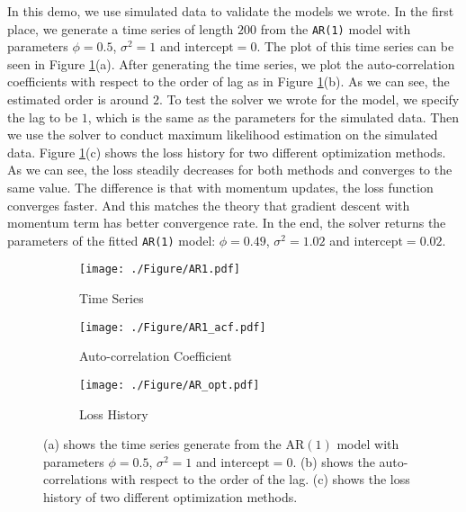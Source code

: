 In this demo, we use simulated data to validate the models we wrote. In the first place, we generate a time series of length $200$ from the \texttt{AR(1)}  model with parameters $\phi = 0.5$, $\sigma^2 = 1$ and $\text{intercept}=0$. The plot of this time series can be seen in Figure \ref{fig:AR1}(a). After generating the time series, we plot the auto-correlation coefficients with respect to the order of lag as in Figure \ref{fig:AR1}(b). As we can see, the estimated order is around $2$. To test the solver we wrote for the model, we specify the lag to be $1$, which is the same as the parameters for the simulated data. Then we use the solver to conduct maximum likelihood estimation on the simulated data. Figure \ref{fig:AR1}(c) shows the loss history for two different optimization methods. As we can see, the loss steadily decreases for both methods and converges to the same value. The difference is that with momentum updates, the loss function converges faster. And this matches the theory that gradient descent with momentum term has better convergence rate. In the end, the solver returns the parameters of the fitted \texttt{AR(1)} model: $\phi=0.49$, $\sigma^2 = 1.02$ and $\text{intercept} = 0.02$.
\begin{figure}[H]
	\centering
	\begin{subfigure}[t]{0.32\linewidth}
		\centering
		\texttt{[image: ./Figure/AR1.pdf]}
		\caption{Time Series}
	\end{subfigure}
	\begin{subfigure}[t]{0.32 \linewidth}
		\centering
		\texttt{[image: ./Figure/AR1\_acf.pdf]}
		\caption{Auto-correlation Coefficient}
	\end{subfigure}
	\begin{subfigure}[t]{0.32\linewidth}
		\centering
		\texttt{[image: ./Figure/AR\_opt.pdf]}
		\caption{Loss History}
	\end{subfigure}
	\caption{(a) shows the time series generate from the AR$(1)$ model with parameters $\phi = 0.5$, $\sigma^2 = 1$ and $\text{intercept}=0$. (b) shows the auto-correlations with respect to the order of the lag. (c) shows the loss history of two different optimization methods.}
	\label{fig:AR1}
\end{figure}
